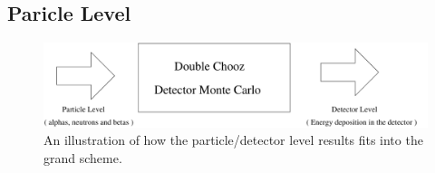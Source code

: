 \documentclass{JINST}
\begin{document}
\subsection{Paricle Level}


\begin{figure}[t]
   \label{PartDetDiagram}	
 \begin{center}
  \includegraphics[scale=0.65]{Part_det_level.pdf}
  
    \end{center}
    \caption{An illustration of how the particle/detector level results fits into the grand scheme. }
 \end{figure}
\end{document}
